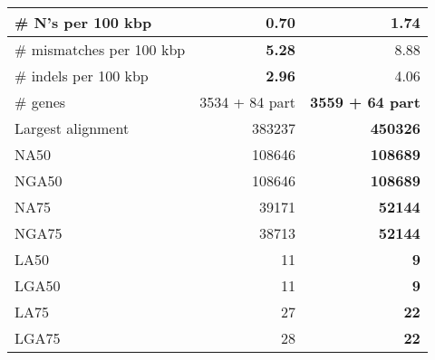 \documentclass[12pt,a4paper]{article}
\begin{document}
\begin{table}[ht]
\begin{center}
\begin{tabular}{|l*{2}{|r}|}
\# N's per 100 kbp & {\bf 0.70} & 1.74 \\ \hline
\# mismatches per 100 kbp & {\bf 5.28} & 8.88 \\ \hline
\# indels per 100 kbp & {\bf 2.96} & 4.06 \\ \hline
\# genes & 3534 + 84 part & {\bf 3559 + 64 part} \\ \hline
Largest alignment & 383237 & {\bf 450326} \\ \hline
NA50 & 108646 & {\bf 108689} \\ \hline
NGA50 & 108646 & {\bf 108689} \\ \hline
NA75 & 39171 & {\bf 52144} \\ \hline
NGA75 & 38713 & {\bf 52144} \\ \hline
LA50 & 11 & {\bf 9} \\ \hline
LGA50 & 11 & {\bf 9} \\ \hline
LA75 & 27 & {\bf 22} \\ \hline
LGA75 & 28 & {\bf 22} \\ \hline
\end{tabular}
\end{center}
\end{table}
\end{document}

